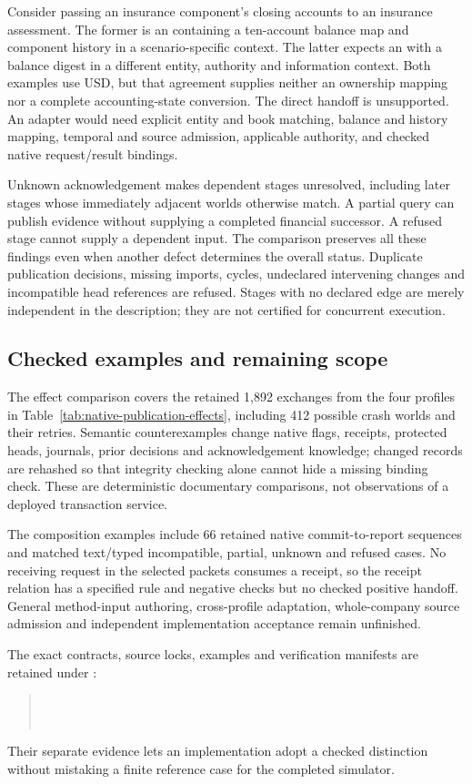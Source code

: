 Consider passing an insurance component's closing accounts to an insurance
assessment. The former is an  containing a ten-account balance
map and component history in a scenario-specific context. The latter expects
an  with a balance digest in a different entity, authority
and information context. Both examples use USD, but that agreement supplies
neither an ownership mapping nor a complete accounting-state conversion. The
direct handoff is unsupported. An adapter would need explicit entity and book
matching, balance and history mapping, temporal and source admission, applicable
authority, and checked native request/result bindings.

Unknown acknowledgement makes dependent stages unresolved, including later
stages whose immediately adjacent worlds otherwise match. A partial query can
publish evidence without supplying a completed financial successor. A refused
stage cannot supply a dependent input. The comparison preserves all these
findings even when another defect determines the overall status. Duplicate
publication decisions, missing imports, cycles, undeclared intervening changes
and incompatible head references are refused. Stages with no declared edge are
merely independent in the description; they are not certified for concurrent
execution.



\subsection{Checked examples and remaining scope}

The effect comparison covers the retained 1,892 exchanges from the four profiles
in Table~\ref{tab:native-publication-effects}, including 412 possible crash worlds
and their retries. Semantic counterexamples change native flags, receipts,
protected heads, journals, prior decisions and acknowledgement knowledge; changed
records are rehashed so that integrity checking alone cannot hide a missing
binding check. These are deterministic documentary comparisons, not observations
of a deployed transaction service.

The composition examples include 66 retained native commit-to-report sequences
and matched text/typed incompatible, partial, unknown and refused cases. No
receiving request in the selected packets consumes a receipt, so the receipt
relation has a specified rule and negative checks but no checked positive
handoff. General method-input authoring, cross-profile adaptation, whole-company
source admission and independent implementation acceptance remain unfinished.

The exact contracts, source locks, examples and verification manifests are
retained under :
\begin{quote}
\small
{}\\
\\
\end{quote}
Their separate evidence lets an implementation adopt a checked distinction
without mistaking a finite reference case for the completed simulator.
